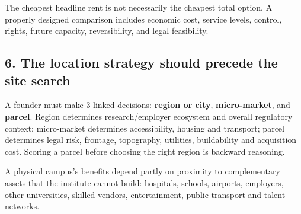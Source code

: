 The cheapest headline rent is not necessarily the cheapest total option. A properly designed comparison includes economic cost, service levels, control, rights, future capacity, reversibility, and legal feasibility.


\subsection{6. The location strategy should precede the site search}

A founder must make 3 linked decisions: \textbf{region or city}, \textbf{micro-market}, and \textbf{parcel}. Region determines research/employer ecosystem and overall regulatory context; micro-market determines accessibility, housing and transport; parcel determines legal risk, frontage, topography, utilities, buildability and acquisition cost. Scoring a parcel before choosing the right region is backward reasoning.

A physical campus's benefits depend partly on proximity to complementary assets that the institute cannot build: hospitals, schools, airports, employers, other universities, skilled vendors, entertainment, public transport and talent networks.
